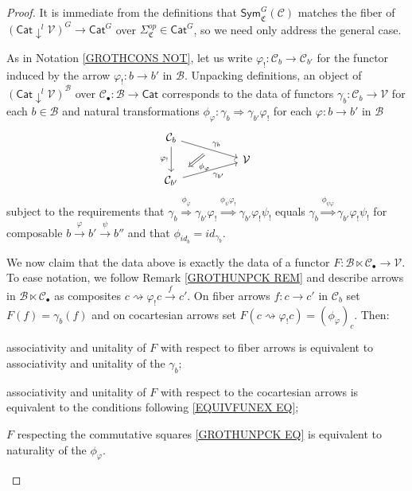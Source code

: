 \documentclass[a4paper,10pt
,draft
]{article}%
\numberwithin{equation}{section}
\numberwithin{figure}{section}
\theoremstyle{definition} %
\newcommand{\V}{\ensuremath{\mathcal V}}
\newcommand{\C}{\ensuremath{\mathcal C}}
\newcommand{\1}{\ensuremath{\mathbbm 1}}%
\begin{document}
\begin{proof}
It is immediate from the definitions that
$\mathsf{Sym}^G_{\mathfrak{C}}(\C)$
matches the fiber of 
$\left(\mathsf{Cat} \downarrow^l \V \right)^{G}
\to \mathsf{Cat}^{G}$
over $\Sigma_{\mathfrak{C}}^{op} \in \mathsf{Cat}^G$,
so we need only address the general case.

As in Notation \ref{GROTHCONS NOT},
let us write $\varphi_! \colon \mathcal{C}_b \to \mathcal{C}_{b'}$
for the functor induced by the arrow 
$\varphi_! \colon b \to b'$
in $\mathcal{B}$.
Unpacking definitions, an object of 
$\left(\mathsf{Cat} \downarrow^l \V \right)^{\mathcal{B}}$
over 
$\mathcal{C}_{\bullet} \colon \mathcal{B} \to \mathsf{Cat}$
corresponds to the data of functors
$\gamma_b \colon \mathcal{C}_b \to \mathcal{V}$ for each $b \in \mathcal{B}$
and natural transformations
$\phi_{\varphi} \colon \gamma_b \Rightarrow \gamma_{b'} \varphi_!$
for each $\varphi \colon b \to b'$ in $\mathcal{B}$
\begin{equation}\label{EQUIVFUNEX EQ}
\begin{tikzcd}[row sep = tiny, column sep = 50pt]
		\mathcal{C}_{b} \arrow{dr}[name=U]{\gamma_b} \arrow{dd}[swap]{\varphi_!}
	\\
		& \mathcal{V}
	\\
		|[alias=V]| \mathcal{C}_{b'} \arrow{ur}[swap]{\gamma_{b'}}
	\arrow[Leftarrow, from=V, to=U,shorten >=0.25cm,shorten <=0.25cm
	,swap,"\phi_{\varphi}"
	]
\end{tikzcd}
\end{equation}
subject to the requirements that
$\gamma_b \overset{\phi_{\varphi}}{\Rightarrow}
\gamma_{b'} \varphi_!
\overset{\phi_{\psi}\varphi_!}{\Rightarrow}
\gamma_{b'} \varphi_! \psi_!
$
equals 
$\gamma_b \overset{\phi_{\psi\varphi}}{\Rightarrow}
\gamma_{b'} \varphi_! \psi_!
$
for composable $b \xrightarrow{\varphi} b' \xrightarrow{\psi} b''$
and that
$\phi_{id_b} = id_{\gamma_b}$.

We now claim that the data above is exactly the data of a functor
$F \colon \mathcal{B} \ltimes \mathcal{C}_{\bullet} \to \mathcal{V}$.
To ease notation, we follow
Remark \ref{GROTHUNPCK REM}
and describe arrows in 
$\mathcal{B} \ltimes \mathcal{C}_{\bullet}$
as composites
$c \rightsquigarrow \varphi_! c \xrightarrow{f} c'$.
On fiber arrows 
$f\colon c \to c'$ in $\mathcal{C}_b$
set $F(f) = \gamma_b(f)$
and on cocartesian arrows set
$F(c \rightsquigarrow \varphi_! c) =
(\phi_{\varphi})_c$.
Then:
\begin{enumerate*}[label=(\roman*)]
\item
associativity and unitality of $F$ with respect to fiber arrows is equivalent to associativity and unitality of the $\gamma_b$;
\item associativity and unitality of $F$ with respect to the cocartesian arrows is equivalent to the conditions following 
\eqref{EQUIVFUNEX EQ};
\item $F$ respecting the commutative squares \eqref{GROTHUNPCK EQ}
is equivalent to naturality of the $\phi_{\varphi}$.
\end{enumerate*}


\end{proof}
\end{document}
